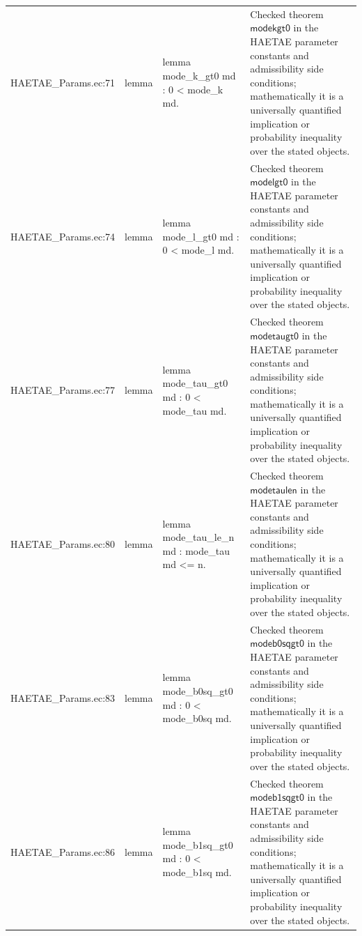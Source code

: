 \documentclass[10pt]{article}
\begin{document}
\begin{longtable}{L{0.11\textwidth}L{0.055\textwidth}L{0.385\textwidth}L{0.41\textwidth}}
HAETAE\_\allowbreak{}Params.\allowbreak{}ec:\allowbreak{}71 & lemma & {\ttfamily\scriptsize lemma mode\_\allowbreak{}k\_\allowbreak{}gt0 md : 0 \textless{} mode\_\allowbreak{}k md.} & Checked theorem $\mathsf{modekgt0}$ in the HAETAE parameter constants and admissibility side conditions; mathematically it is a universally quantified implication or probability inequality over the stated objects. \\
HAETAE\_\allowbreak{}Params.\allowbreak{}ec:\allowbreak{}74 & lemma & {\ttfamily\scriptsize lemma mode\_\allowbreak{}l\_\allowbreak{}gt0 md : 0 \textless{} mode\_\allowbreak{}l md.} & Checked theorem $\mathsf{modelgt0}$ in the HAETAE parameter constants and admissibility side conditions; mathematically it is a universally quantified implication or probability inequality over the stated objects. \\
HAETAE\_\allowbreak{}Params.\allowbreak{}ec:\allowbreak{}77 & lemma & {\ttfamily\scriptsize lemma mode\_\allowbreak{}tau\_\allowbreak{}gt0 md : 0 \textless{} mode\_\allowbreak{}tau md.} & Checked theorem $\mathsf{modetaugt0}$ in the HAETAE parameter constants and admissibility side conditions; mathematically it is a universally quantified implication or probability inequality over the stated objects. \\
HAETAE\_\allowbreak{}Params.\allowbreak{}ec:\allowbreak{}80 & lemma & {\ttfamily\scriptsize lemma mode\_\allowbreak{}tau\_\allowbreak{}le\_\allowbreak{}n md : mode\_\allowbreak{}tau md \textless{}= n.} & Checked theorem $\mathsf{modetaulen}$ in the HAETAE parameter constants and admissibility side conditions; mathematically it is a universally quantified implication or probability inequality over the stated objects. \\
HAETAE\_\allowbreak{}Params.\allowbreak{}ec:\allowbreak{}83 & lemma & {\ttfamily\scriptsize lemma mode\_\allowbreak{}b0sq\_\allowbreak{}gt0 md : 0 \textless{} mode\_\allowbreak{}b0sq md.} & Checked theorem $\mathsf{modeb0sqgt0}$ in the HAETAE parameter constants and admissibility side conditions; mathematically it is a universally quantified implication or probability inequality over the stated objects. \\
HAETAE\_\allowbreak{}Params.\allowbreak{}ec:\allowbreak{}86 & lemma & {\ttfamily\scriptsize lemma mode\_\allowbreak{}b1sq\_\allowbreak{}gt0 md : 0 \textless{} mode\_\allowbreak{}b1sq md.} & Checked theorem $\mathsf{modeb1sqgt0}$ in the HAETAE parameter constants and admissibility side conditions; mathematically it is a universally quantified implication or probability inequality over the stated objects. \\

\end{longtable}
\end{document}

